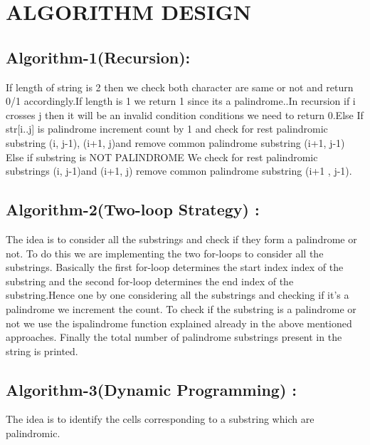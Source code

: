 \documentclass[conference]{IEEEtran}
\begin{document}
\bigskip\section{ALGORITHM DESIGN}



\bigskip\subsection{Algorithm-1(Recursion):}

If length of string is 2 then we check both character are same or not and return 0/1 accordingly.If length is 1 we return 1 since its a palindrome..In recursion if i crosses j then it will be an invalid condition conditions we need to return 0.Else If str[i..j] is palindrome increment count by 1 and check for rest palindromic substring (i, j-1), (i+1, j)and remove common palindrome substring (i+1, j-1) Else if substring is NOT PALINDROME We check for rest palindromic substrings (i, j-1)and (i+1, j) remove common palindrome substring (i+1 , j-1).

\bigskip\subsection{Algorithm-2(Two-loop Strategy) :}

The idea is to consider all the substrings and check if they form a palindrome or not.
To do this we are implementing the two for-loops to consider all the substrings. Basically the first for-loop determines the start index index of the substring and the second for-loop determines the end index of the substring.Hence one by one considering all the substrings and checking if it’s a palindrome we increment the count.
To check if the substring is a palindrome or not we use the ispalindrome function explained already in the above mentioned approaches.
Finally the total number of palindrome substrings present in the string is printed.


\bigskip\subsection{Algorithm-3(Dynamic Programming) :}

The idea is to identify the cells corresponding to a substring which are palindromic.\\
\end{document}
